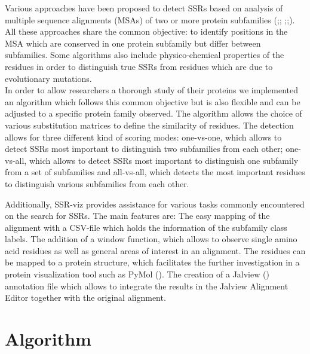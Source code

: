 \documentclass{bioinfo}
\begin{document}
%
Various approaches have been proposed to detect SSRs based on analysis of multiple sequence 
alignments (MSAs) of two or more protein subfamilies (\citealp{Hannenhalli01};\citealp{Edwards01};
\citealp{Olivera-Nappa01};\citealp{Suplatov01};\citealp{Suplatov02}). 
All these approaches share the 
common objective: to identify positions in the MSA which are conserved in one 
protein subfamily but differ between subfamilies. Some algorithms also include
physico-chemical properties of the residues in order to distinguish
true SSRs from residues which are due to evolutionary mutations. \\
%
In order to allow researchers a thorough study of their proteins we implemented an algorithm 
which follows this common objective but is also flexible and can be adjusted to a specific 
protein family observed. The algorithm allows the choice of various substitution matrices to define the similarity of residues.
The detection allows for three different kind of scoring modes: one-vs-one, which allows to detect SSRs most important to 
distinguish two subfamilies from each other; one-vs-all, which allows to detect SSRs most important to distinguish
one subfamily from a set of subfamilies and all-vs-all, which detects the most important residues to distinguish various 
subfamilies from each other.

Additionally, SSR-viz provides assistance for various tasks commonly encountered on the search for SSRs.
The main features are: The easy mapping of the alignment with a CSV-file which holds the information of 
the subfamily class labels. The addition of a window function, which allows to observe
single amino acid residues as well as general areas of interest in an alignment.
The residues can be mapped to a protein structure, which facilitates the
further investigation in a protein visualization tool such as PyMol (\citealp{schroedinger01}).
The creation of a Jalview (\citealp{clamp01}) annotation file which allows to integrate the results 
in the Jalview Alignment Editor together with the original alignment.
%
\section{Algorithm}
%
\end{document}
